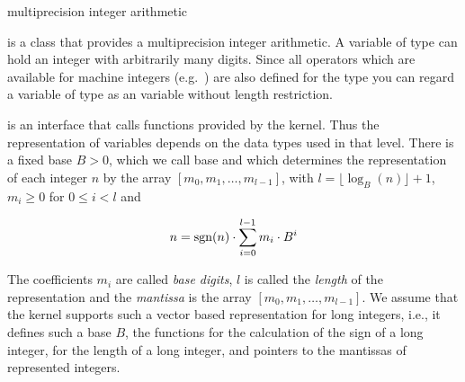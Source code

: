

\NAME

 \dotfill multiprecision integer arithmetic



\ABSTRACT

 is a class that provides a multiprecision integer arithmetic.  A variable of type
 can hold an integer with arbitrarily many digits.  Since all operators which are
available for machine integers (e.g.~) are also defined for the type  you
can regard a variable of type  as an  variable without length
restriction.



\DESCRIPTION

\label{bigint_description} is an interface that calls
functions provided by the kernel.  Thus the representation of variables depends on the data
types used in that level.  There is a fixed base $B > 0$, which we call  base and
which determines the representation of each integer $n$ by the array $[m_0, m_1, \dots, m_{l -
  1}]$, with $l = \lfloor \log_B (n) \rfloor + 1$, $m_i \geq 0$ for $0 \leq i < l$ and

\begin{displaymath}
  n = \operatorname{sgn}(n) \cdot \sum_{i = 0}^{l - 1} {m_i \cdot B^i}
\end{displaymath}

The coefficients $m_i$ are called \emph{base digits}, $l$ is called the \emph{length} of the
representation and the \emph{mantissa} is the array $[m_0, m_1, \dots, m_{l-1}]$.  We assume
that the kernel supports such a vector based representation for long integers, i.e., it defines
such a base $B$, the functions  for the calculation of the sign of a long integer,
 for the length of a long integer, and pointers to the mantissas of represented
integers.




